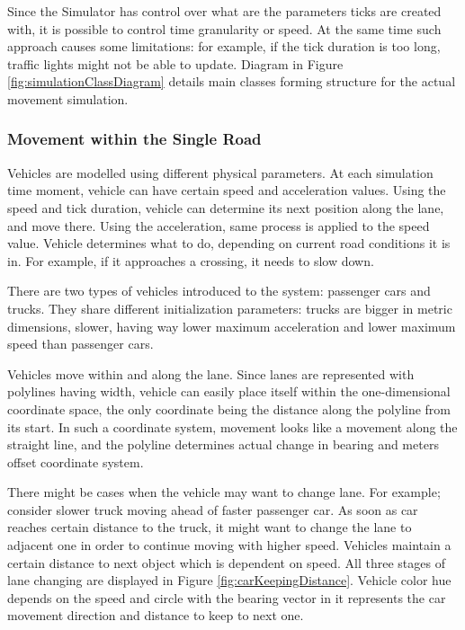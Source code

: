 Since the Simulator has control over what are the parameters ticks are created with, it is possible to control time granularity or speed. At the same time such approach causes some limitations: for example, if the tick duration is too long, traffic lights might not be able to update.
Diagram in Figure \ref{fig:simulationClassDiagram} details main classes forming structure for the actual movement simulation.

\subsubsection{Movement within the Single Road}
Vehicles are modelled using different physical parameters. At each simulation time moment, vehicle can have certain speed and acceleration values. Using the speed and tick duration, vehicle can determine its next position along the lane, and move there. Using the acceleration, same process is applied to the speed value. Vehicle determines what to do, depending on current road conditions it is in. For example, if it approaches a crossing, it needs to slow down.

There are two types of vehicles introduced to the system: passenger cars and trucks. They share different initialization parameters: trucks are bigger in metric dimensions, slower, having way lower maximum acceleration and lower maximum speed than passenger cars.

Vehicles move within and along the lane. Since lanes are represented with polylines having width, vehicle can easily place itself within the one-dimensional coordinate space, the only coordinate being the distance along the polyline from its start. In such a coordinate system, movement looks like a movement along the straight line, and the polyline determines actual change in bearing and meters offset coordinate system.

There might be cases when the vehicle may want to change lane. For example; consider slower truck moving ahead of faster passenger car. As soon as car reaches certain distance to the truck, it might want to change the lane to adjacent one in order to continue moving with higher speed. Vehicles maintain a certain distance to next object which is dependent on speed. All three stages of lane changing are displayed in Figure \ref{fig:carKeepingDistance}. Vehicle color hue depends on the speed and circle with the bearing vector in it represents the car movement direction and distance to keep to next one.

